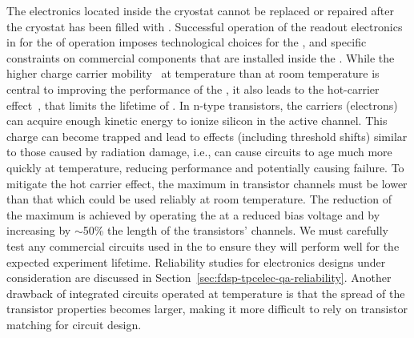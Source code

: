 The electronics located inside the cryostat cannot be replaced or repaired after the
cryostat has been filled with . Successful operation of the readout electronics 
in  for the \dunelifetime of  operation imposes technological 
choices for the  , 
and specific constraints on commercial components that are installed
inside the . While the higher charge carrier 
mobility~\cite{Hairapetian1989} at  temperature than at room
temperature is central to improving the performance of the  , it also leads
to the hot-carrier effect~\cite{Hot-electron}, that limits the lifetime of .
In n-type  transistors, the carriers (electrons)
can acquire enough kinetic energy to ionize silicon in the active channel. This
charge can become trapped and lead to effects (including threshold shifts)
similar to those caused by radiation damage, i.e., can cause 
circuits to age much more quickly at  temperature, 
reducing performance and potentially causing failure. To mitigate the hot carrier effect,
the maximum \efield in transistor channels must be lower than 
that which could be used reliably at room temperature. The reduction of
the maximum \efield is achieved by operating the  at a
reduced bias voltage and by increasing by $\sim$50\% the length 
of the transistors' channels. We must carefully test any commercial 
circuits used in the  to ensure they will perform well for 
the expected experiment lifetime. Reliability studies for  
electronics designs under consideration are discussed in Section~\ref{sec:fdsp-tpcelec-qa-reliability}.
Another drawback of integrated circuits operated at  temperature
is that the spread of the transistor properties becomes larger, making it
more difficult to rely on transistor matching for circuit design.
